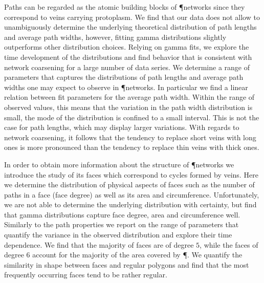 		Paths can be regarded as the atomic building blocks of \P networks since they correspond to veins carrying protoplasm. We find that our data does not allow to unambiguously determine the underlying theoretical distribution of path lengths and average path widths, however, fitting gamma distributions slightly outperforms other distribution choices. Relying on gamma fits, we explore the time development of the distributions and find behavior that is consistent with network coarsening for a large number of data series. We determine a range of parameters that captures the distributions of path lengths and average path widths one may expect to observe in \P networks. In particular we find a linear relation between fit parameters for the average path width. Within the range of observed values, this means that the variation in the path width distribution is small, \ie the mode of the distribution is confined to a small interval. This is not the case for path lengths, which may display larger variations. With regards to network coarsening, it follows that the tendency to replace short veins with long ones is more pronounced than the tendency to replace thin veins with thick ones.

		In order to obtain more information about the structure of \P networks we introduce the study of its faces which correspond to cycles formed by veins.	Here we determine the distribution of physical aspects of faces such as the number of paths in a face (face degree) as well as its area and circumference. Unfortunately, we are not able to determine the underlying distribution with certainty, but find that gamma distributions capture face degree, area and circumference well. Similarly to the path properties we report on the range of parameters that quantify the variance in the observed distribution and explore their time dependence. We find that the majority of faces are of degree $5$, while the faces of degree $6$ account for the majority of the area covered by \P. We quantify the similarity in shape between faces and regular polygons and find that the most frequently occurring faces tend to be rather regular.

